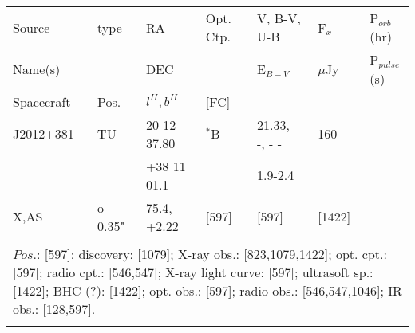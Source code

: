 \documentclass{aa}
\begin{document}
\begin{tabular}{p{2.5cm}p{1cm}p{1.8cm}p{2.3cm}p{3.3cm}p{2.0cm}p{2.2cm}}
\noalign{\smallskip}
\multicolumn{7}{p{17.5cm}}{Table 1.  (continued) }\\        
\hline
\noalign{\smallskip}
Source         & type  & RA                       &  Opt. Ctp. & V, B-V, U-B  & F$_{x}$          & P$_{orb}$(hr)    \\
Name(s)       &            & DEC                    &                     & E$_{B-V}$   & $\mu$Jy        & P$_{pulse}$(s) \\
Spacecraft & Pos.  & $l^{II}, b^{II}$      &  [FC]           &                        &                         &                             \\
\noalign{\smallskip} 
\hline

\noalign{\smallskip}
J2012+381     & TU         & 20 12 37.80   &  $^*$B            & 21.33, - -, - -             & 160                &          \\
                         &                & +38 11 01.1   &                         & 1.9-2.4                      &                       &    \\
X,AS                & o 0.35"  & 75.4, +2.22     & [597]               & [597]                         & [1422]           &         \\
\\
\multicolumn{7}{p{17.5cm}}{
$Pos$.: [597]; discovery: [1079]; X-ray obs.: [823,1079,1422]; opt. cpt.: [597]; radio cpt.: [546,547]; 
 X-ray light curve: [597]; ultrasoft sp.: [1422]; BHC (?): [1422]; opt. obs.: [597]; 
radio obs.: [546,547,1046]; IR obs.: [128,597].}\\
\noalign{\smallskip}
\hline


\end{tabular}
\end{document}

